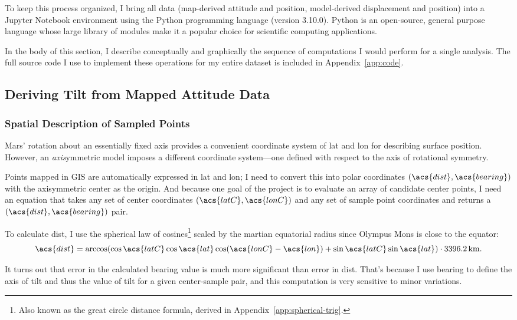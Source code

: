 To keep this process organized, I bring all data (map-derived attitude and position, model-derived displacement and position) into a Jupyter Notebook environment using the Python programming language (version 3.10.0). Python is an open-source, general purpose language whose large library of modules make it a popular choice for scientific computing applications.

In the body of this section, I describe conceptually and graphically the sequence of computations I would perform for a single analysis. The full source code I use to implement these operations for my entire dataset is included in Appendix~\ref{app:code}.

\subsection{Deriving Tilt from Mapped Attitude Data}

\subsubsection{Spatial Description of Sampled Points}

Mars' rotation about an essentially fixed axis provides a convenient coordinate system of \ac{lat} and \ac{lon} for describing surface position. However, an \emph{axis}ymmetric model imposes a different coordinate system---one defined with respect to the axis of rotational symmetry.

Points mapped in GIS are automatically expressed in \ac{lat} and \ac{lon}; I need to convert this into polar coordinates $(\acs{dist},\acs{bearing})$ with the axisymmetric center as the origin. And because one goal of the project is to evaluate an array of candidate center points, I need an equation that takes any set of center coordinates $(\acs{latC}, \acs{lonC})$ and any set of sample point coordinates and returns a $(\acs{dist},\acs{bearing})$ pair.

To calculate \acf{dist}, I use the spherical law of cosines\footnote{Also known as the great circle distance formula, derived in Appendix~\ref{app:spherical-trig}.} scaled by the martian equatorial radius since Olympus Mons is close to the equator:
\begin{equation}
    \acs{dist}=\arccos(\cos\acs{latC}\cos\acs{lat}\cos(\acs{lonC}-\acs{lon}) + \sin\acs{latC}\sin\acs{lat})\cdot\qty{3396.2}{\km}.
\end{equation}

It turns out that error in the calculated \acs{bearing} value is much more significant than error in \acs{dist}. That's because I use \acs{bearing} to define the axis of tilt and thus the value of tilt for a given center-sample pair, and this computation is very sensitive to minor variations.

